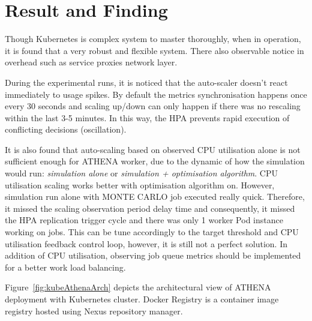\newpage

\section{Result and Finding}

Though Kubernetes is complex system to master thoroughly, when in operation, it is found that a very robust and flexible system. There also observable notice in overhead such as service proxies network layer. 

During the experimental runs, it is noticed that the auto-scaler doesn't react immediately to usage spikes. By default the metrics synchronisation happens once every 30 seconds and scaling up/down can only happen if there was no rescaling within the last 3-5 minutes. In this way, the HPA prevents rapid execution of conflicting decisions (oscillation). 

It is also found that auto-scaling based on observed CPU utilisation alone is not sufficient enough for ATHENA worker, due to the dynamic of how the simulation would run: \emph{simulation alone} or \emph{simulation + optimisation algorithm}. CPU utilisation scaling works better with optimisation algorithm on. However, simulation run alone with MONTE CARLO job executed really quick. Therefore, it missed the scaling observation period delay time and consequently, it missed the HPA replication trigger cycle and there was only 1 worker Pod instance working on jobs. This can be tune accordingly to the target threshold and CPU utilisation feedback control loop, however, it is still not a perfect solution. In addition of CPU utilisation, observing job queue metrics should be implemented for a better work load balancing.

Figure~\ref{fig:kubeAthenaArch} depicts the architectural view of ATHENA deployment with Kubernetes cluster. Docker Registry is a container image registry hosted using Nexus repository manager.

